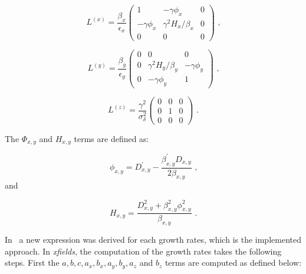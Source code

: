 \begin{equation}
    L^{(x)} = \frac{\beta_x}{\epsilon_x} \left(
        \begin{array}{ccc}
            1              & -\gamma \phi_x         & 0 \\
            -\gamma \phi_x & \gamma^2 H_x / \beta_x & 0 \\
            0              & 0                      & 0
        \end{array} \right) \text{ ,}
\end{equation}

\begin{equation}
    L^{(y)} = \frac{\beta_y}{\epsilon_y} \left(
        \begin{array}{ccc}
            0 & 0                      & 0 \\
            0 & \gamma^2 H_y / \beta_y & -\gamma \phi_y \\
            0 & -\gamma \phi_y         & 1
        \end{array} \right) \text{ ,}
\end{equation}

\begin{equation}
    L^{(z)} = \frac{\gamma^2}{\sigma_\delta^2} \left(
        \begin{array}{lll}
            0 & 0 & 0 \\
            0 & 1 & 0 \\
            0 & 0 & 0
        \end{array} \right) \text{ .}
\end{equation}

The \(\Phi_{x,y}\) and \(H_{x,y}\) terms are defined as:

\begin{equation}
    \phi_{x,y} = D_{x,y}^{\prime} - \frac{\beta_{x,y}^{\prime} D_{x,y}}{2 \beta_{x,y}} \text{ ,}
    \label{equation:bm_phi}
\end{equation}
and

\begin{equation}
    H_{x,y} = \frac{D_{x,y}^2 + \beta_{x,y}^2 \phi_{x,y}^2}{\beta_{x,y}} \text{ .}
    \label{equation:bm_h}
\end{equation}

In~\cite{CERN:Antoniou:Revision_IBS_MADX} a new expression was derived for each growth rates, which is the implemented approach.
In \textit{xfields}, the computation of the growth rates takes the following steps.
First the \(a, b, c, a_x, b_x, a_y, b_y, a_z\) and \(b_z\) terms are computed as defined below:

